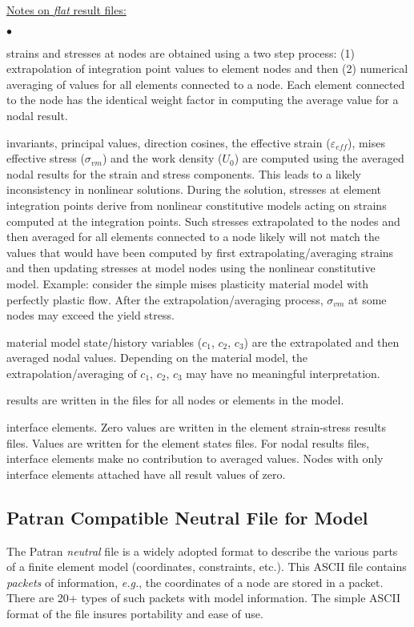\documentclass[11pt]{report}
\numberwithin{equation}{section}
\newcommand{\nin} {\noindent}
\newcommand{\ul} {\underline}
\newcommand{\eg}{\emph{e.g.},\xspace}
\newcommand{\ti}{\emph}
\newcommand{\veps}{\varepsilon}
\newcommand{\squishlist}{
 \begin{list}{$\bullet$}
  { \setlength{\itemsep}{0pt}
     \setlength{\parsep}{3pt}
     \setlength{\topsep}{3pt}
     \setlength{\partopsep}{0pt}
     \setlength{\leftmargin}{1.5em}
     \setlength{\labelwidth}{1em}
     \setlength{\labelsep}{0.5em} } }
\newcommand{\squishend}{
  \end{list}  }
\begin{document}
\nin \ul{Notes on \ti{flat} result files:}
\small
\squishlist
\item strains
and stresses at nodes are obtained using a two step process: (1) extrapolation
of integration point values to element nodes and then (2) numerical averaging of
values for all elements connected to a node. Each element connected to the node has the
identical weight factor in computing the average value for a nodal result.
\item invariants, principal values, direction cosines, the effective strain 
($\veps_{eff}$), mises effective stress ($\sigma_{vm}$) and the work density ($U_0$) are 
computed using the averaged nodal results for the strain and stress
components. This leads to a likely inconsistency in nonlinear solutions. During the 
solution, stresses
at element integration points derive from nonlinear constitutive models
acting on strains computed at the integration points. Such stresses extrapolated to
the nodes and then averaged for all elements connected to a node likely
will not match the values that would have been computed by first extrapolating/averaging 
strains and then updating stresses at model nodes using the nonlinear
constitutive model. Example: consider the simple mises plasticity material model with 
perfectly plastic flow. After the extrapolation/averaging process, $\sigma_{vm}$
at some nodes may exceed the yield stress.
\item material model state/history
variables ($c_1$, $c_2$, $c_3$) are the extrapolated and 
then averaged nodal values. Depending on the material model, the extrapolation/averaging
of $c_1$, $c_2$, $c_3$ may have no meaningful interpretation.
\item results are written in the files for all nodes or elements in the model.
\item interface elements.  Zero values are written in the  element strain-stress
results files. Values are written for the element states files.
 For nodal results files, interface elements make no contribution to averaged values.
 Nodes with only interface elements attached have all result values of zero.
\squishend
\normalsize

\subsection{Patran Compatible Neutral File for Model}
\nin The Patran \ti{neutral} file is a widely adopted format
to describe the various parts of a finite element model (coordinates, constraints,
etc.). This ASCII file contains \ti{packets} of information, \eg the coordinates
of a node are stored in a packet. There are 20+ types of such
packets with model information. The simple ASCII format of the file insures
portability and ease of use. 
\end{document}
